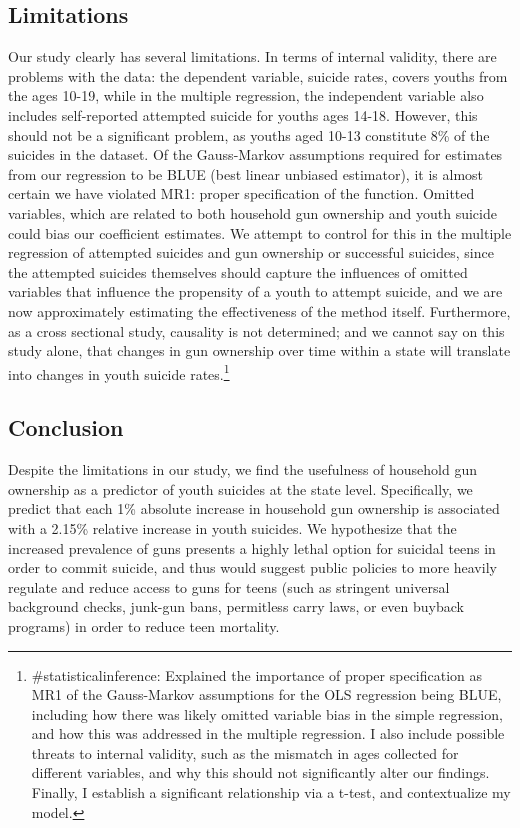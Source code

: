 \documentclass{article}
\begin{document}
\subsection*{Limitations}

Our study clearly has several limitations. In terms of internal validity, there are problems with the data: the dependent variable, suicide rates, covers youths from the ages 10-19, while in the multiple regression, the independent variable also includes self-reported attempted suicide for youths ages 14-18. However, this should not be a significant problem, as youths aged 10-13 constitute 8\% of the suicides in the dataset. Of the Gauss-Markov assumptions required for estimates from our regression to be BLUE (best linear unbiased estimator), it is almost certain we have violated MR1: proper specification of the function. Omitted variables, which are related to both household gun ownership and youth suicide could bias our coefficient estimates. We attempt to control for this in the  multiple regression of attempted suicides and gun ownership or successful suicides, since the attempted suicides themselves should capture the influences of omitted variables that influence the propensity of a youth to attempt suicide, and we are now approximately estimating the effectiveness of the method itself. Furthermore, as a cross sectional study, causality is not determined; and we cannot say on this study alone, that changes in gun ownership over time within a state will translate into changes in youth suicide rates.\footnote{\#statisticalinference: Explained the importance of proper specification as MR1 of the Gauss-Markov assumptions for the OLS regression being BLUE, including how there was likely omitted variable bias in the simple regression, and how this was addressed in the multiple regression. I also include possible threats to internal validity, such as the mismatch in ages collected for different variables, and why this should not significantly alter our findings. Finally, I establish a significant relationship via a t-test, and contextualize my model.} \\


\subsection*{Conclusion}
Despite the limitations in our study, we find the usefulness of household gun ownership as a predictor of youth suicides at the state level. Specifically, we predict that each 1\% absolute increase in household gun ownership is associated with a 2.15\% relative increase in youth suicides. We hypothesize that the increased prevalence of guns presents a highly lethal option for suicidal teens in order to commit suicide, and thus would suggest public policies to more heavily regulate and reduce access to guns for teens (such as stringent universal background checks, junk-gun bans, permitless carry laws, or even buyback programs) in order to reduce teen mortality.\\
\end{document}
